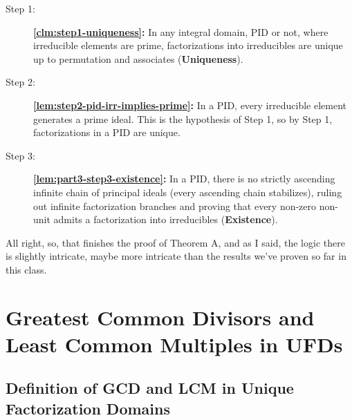 \begin{content}

\begin{steps}
\begin{description}
    \item[Step 1:] \textbf{\cref{clm:step1-uniqueness}:} In any integral domain, PID or not, where irreducible elements are prime, factorizations into irreducibles are unique up to permutation and associates (\textbf{Uniqueness}).
    \item[Step 2:] \textbf{\cref{lem:step2-pid-irr-implies-prime}:} In a PID, every irreducible element generates a prime ideal. This is the hypothesis of Step 1, so by Step 1, factorizations in a PID are unique.
    \item[Step 3:] \textbf{\cref{lem:part3-step3-existence}:} In a PID, there is no strictly ascending infinite chain of principal ideals (every ascending chain stabilizes), ruling out infinite factorization branches and proving that every non-zero non-unit admits a factorization into irreducibles (\textbf{Existence}).
\end{description}
\end{steps}
\end{content}

\begin{speech}[01:15:35 - 01:15:54]

All right, so, that finishes the proof of Theorem A, and as I said, the logic there is slightly intricate, maybe more intricate than the results we've proven so far in this class.
\end{speech}

\section{Greatest Common Divisors and Least Common Multiples in UFDs}

\subsection{Definition of GCD and LCM in Unique Factorization Domains}

